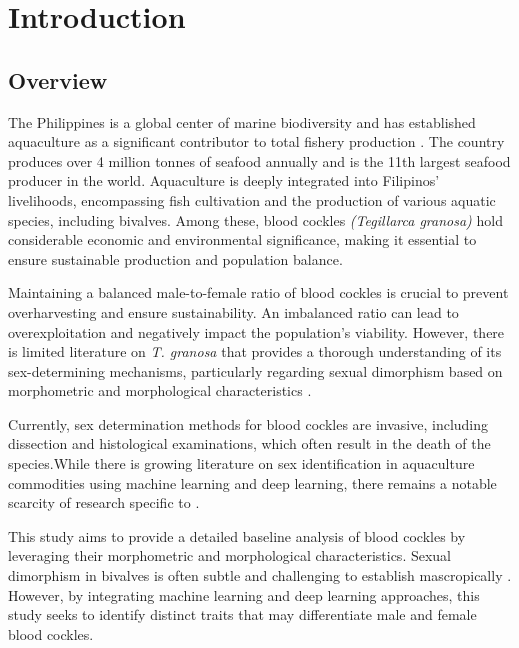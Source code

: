 \chapter{Introduction}
\label{sec:researchdesc}    %

\section{Overview}
\label{sec:overview}

The Philippines is a global center of marine biodiversity and has established aquaculture as a significant contributor to total fishery production \cite{aypa2000, bfar2019}. The country produces over 4 million tonnes of seafood annually and is the 11th largest seafood producer in the world. Aquaculture is deeply integrated into Filipinos' livelihoods, encompassing fish cultivation and the production of various aquatic species, including bivalves. Among these, blood cockles \textit{(Tegillarca granosa)} hold considerable economic and environmental significance, making it essential to ensure sustainable production and population balance.

Maintaining a balanced male-to-female ratio of blood cockles is crucial to prevent overharvesting and ensure sustainability. An imbalanced ratio can lead to overexploitation and negatively impact the population's viability. However, there is limited literature on \textit{T. granosa} that provides a thorough understanding of its sex-determining mechanisms, particularly regarding sexual dimorphism based on morphometric and morphological characteristics \cite{breton2017sex}.

Currently, sex determination methods for blood cockles are invasive, including dissection and histological examinations, which often result in the death of the species.While there is growing literature on sex identification in aquaculture commodities using machine learning and deep learning, there remains a notable scarcity of research specific to \Tgranosa \cite{miranda2023}.

This study aims to provide a detailed baseline analysis of blood cockles by leveraging their morphometric and morphological characteristics. Sexual dimorphism in bivalves is often subtle and challenging to establish mascropically \cite{karapunar2021}. However, by integrating machine learning and deep learning approaches, this study seeks to identify distinct traits that may differentiate male and female blood cockles. 

